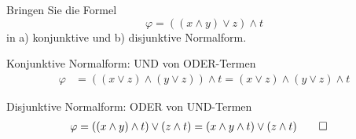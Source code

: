 Bringen Sie die Formel
\[
\varphi
=
((x\wedge y) \vee z) \wedge t
\]
in a) konjunktive und b) disjunktive Normalform.

\begin{loesung}
\begin{teilaufgaben}
\item Konjunktive Normalform: UND von ODER-Termen
\begin{align*}
\varphi
&=
((x\vee z)\wedge (y\vee z)) \wedge t
=
(x\vee z) \wedge (y\vee z) \wedge t
\end{align*}
\item Disjunktive Normalform: ODER von UND-Termen
\begin{align*}
\varphi
&=
((x\wedge y)\wedge t)\vee(z\wedge t)
=
(x\wedge y \wedge t) \vee (z\wedge t)
\qedhere
\end{align*}
\end{teilaufgaben}
\end{loesung}
